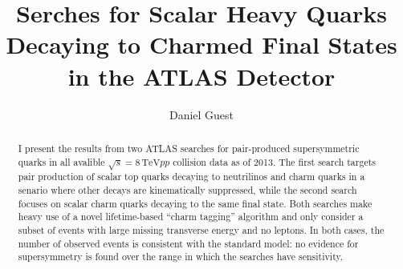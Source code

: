 \documentclass{article}
\title{Serches for Scalar Heavy Quarks Decaying to Charmed Final States in the ATLAS Detector}
\author{Daniel Guest}
\begin{document}
\newcommand{\cmenergy}{\ensuremath{\sqrt{s} = 8\,\text{TeV}}\xspace}

\maketitle

\begin{abstract}
I present the results from two ATLAS searches for pair-produced supersymmetric quarks in all avalible \cmenergy $pp$ collision data as of 2013. The first search targets pair production of scalar top quarks decaying to neutrilinos and charm quarks in a senario where other decays are kinematically suppressed, while the second search focuses on scalar charm quarks decaying to the same final state. Both searches make heavy use of a novel lifetime-based ``charm tagging'' algorithm and only consider a subset of events with large missing transverse energy and no leptons. In both cases, the number of observed events is consistent with the standard model: no evidence for supersymmetry is found over the range in which the searches have sensitivity.
\end{abstract}
\end{document}
